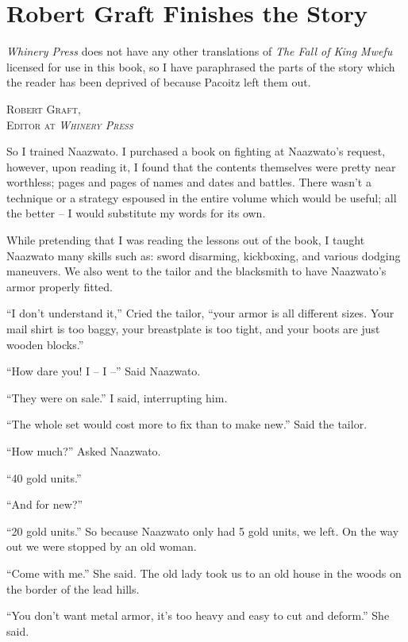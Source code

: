 \chapter{Robert Graft Finishes the Story}
\emph{Whinery Press} does not have any other translations of \emph{The Fall of King Mwefu} licensed for use in this book, so I have paraphrased the parts of the story which the reader has been deprived of because Pacoitz left them out.

\begin{flushright}
\textsc{
Robert Graft,\\
Editor at \emph{Whinery Press}}
\end{flushright}

\tbreak

So I trained Naazwato. I purchased a book on fighting at Naazwato's request, however, upon reading it, I found that the contents themselves were pretty near worthless; pages and pages of names and dates and battles. There wasn't a technique or a strategy espoused in the entire volume which would be useful; all the better -- I would substitute my words for its own.

While pretending that I was reading the lessons out of the book, I taught Naazwato many skills such as: sword disarming, kickboxing, and various dodging maneuvers.  We also went to the tailor and the blacksmith to have Naazwato's armor properly fitted.

``I don't understand it,'' Cried the tailor, ``your armor is all different sizes. Your mail shirt is too baggy, your breastplate is too tight, and your boots are just wooden blocks.''

``How dare you! I -- I --'' Said Naazwato.

``They were on sale.'' I said, interrupting him.

``The whole set would cost more to fix than to make new.'' Said the tailor.

``How much?'' Asked Naazwato.

``40 gold units.'' 

``And for new?''

``20 gold units.'' So because Naazwato only had 5 gold units, we left. On the way out we were stopped by an old woman.

``Come with me.'' She said. The old lady took us to an old house in the woods on the border of the lead hills.

``You don't want metal armor, it's too heavy and easy to cut and deform.'' She said.

